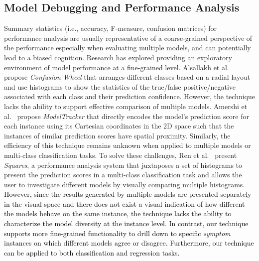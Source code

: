\documentclass[preprint,journal]{vgtc}       %
\newcommand{\revcolor}{black}
\begin{document}
\subsection{Model Debugging and Performance Analysis}
Summary statistics (i.e., accuracy, F-measure, confusion matrices) for performance analysis are usually representative of a coarse-grained perspective of the performance especially when evaluating multiple models, and can potentially lead to a biased cognition. Research has explored providing an exploratory environment of model performance at a fine-grained level. Alsallakh et al.~\cite{alsallakh2014visual} propose \textit{Confusion Wheel} that arranges different classes based on a radial layout and use histograms to show the statistics of the true/false positive/negative associated with each class and their prediction confidence. However, the technique lacks the ability to support effective comparison of multiple models. Amershi et al.~\cite{amershi2015modeltracker} propose \textit{ModelTracker} that directly encodes the model's prediction score for each instance using its Cartesian coordinates in the 2D space such that the instances of similar prediction scores have spatial proximity. Similarly, the efficiency of this technique remains unknown when applied to multiple models or multi-class classification tasks. To solve these challenges, Ren et al.~\cite{ren2017squares} present \textit{Squares}, a performance analysis system that juxtaposes a set of histograms to present the prediction scores in a multi-class classification task and allows the user to investigate different models by visually comparing multiple histograms.
\textcolor{\revcolor}{However, since the results generated by multiple models are presented separately in the visual space and there does not exist a visual indication of how different the models behave on the same instance, the technique lacks the ability to characterize the model diversity at the instance level. In contrast, our technique supports more fine-grained functionality to drill down to specific \textit{symptom} instances on which different models agree or disagree. Furthermore, our technique can be applied to both classification and regression tasks.}
\end{document}
